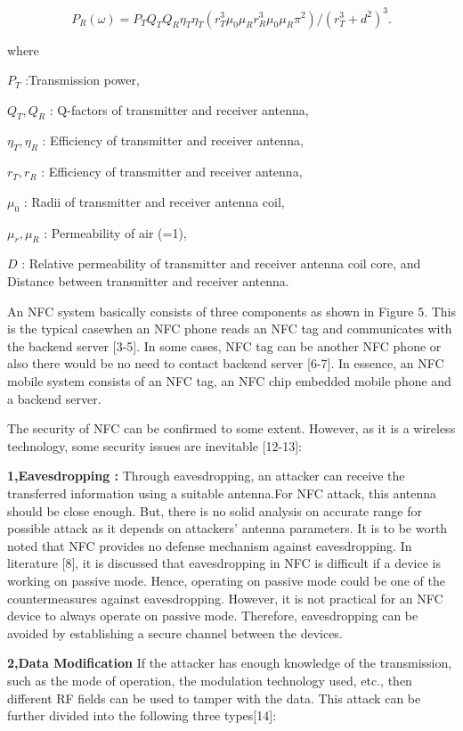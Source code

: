 \documentclass[journal]{IEEEtran}
\begin{document}
$$ P_{R}(\omega)=P_{T}Q_{T}Q_{R}\eta_{T}\eta_{T}(r_{T}^{3}\mu_{0}\mu_{R}r_{R}^{3}\mu_{0}\mu_{R}\pi^{2})/(r_{T}^{3}+d^{2})^{3}.$$

where 

$P_{T}$    :Transmission power,
           
$Q_{T},Q_{R}$           : Q-factors of transmitter and receiver antenna,
          
$\eta_{T},\eta_{R}$    : Efficiency of transmitter and receiver antenna,              
                      
$r_{T},r_{R}$            : Efficiency of transmitter and receiver antenna,
           
$\mu_{0}$                          : Radii of transmitter and receiver antenna coil,
           
$\mu_{r},\mu_{R}$                        : Permeability of air (=1),
           
$D$           : Relative permeability of transmitter and receiver antenna coil core, and Distance between transmitter and receiver antenna.

An NFC system basically consists of three components as shown in Figure 5. This is the typical casewhen an NFC phone reads an NFC tag and communicates with the backend server [3-5]. In some cases, NFC tag can be another NFC phone or also there would be no need to contact backend server [6-7]. In essence, an NFC mobile system consists of an NFC tag, an NFC chip embedded mobile phone
and a backend server.

The security of NFC can be confirmed to some extent. However, as it is a wireless technology, some security issues are inevitable [12-13]:

\textbf{1,Eavesdropping :} Through eavesdropping, an attacker can receive the transferred information using a suitable antenna.For NFC attack, this antenna should be close enough. But, there is no solid analysis on accurate range
for possible attack as it depends on attackers' antenna parameters. It is to be worth noted that NFC provides no defense mechanism against eavesdropping. In literature [8], it is discussed that eavesdropping in NFC is difficult if a device is working on passive mode. Hence, operating on passive mode could be one of the countermeasures against eavesdropping. However, it is not practical for an NFC device to always operate on passive mode. Therefore, eavesdropping can be avoided by establishing a secure channel between the devices.

\textbf{2,Data Modification}
If the attacker has enough knowledge of the transmission, such as the mode of operation, the modulation technology used, etc., then different RF fields can be used to tamper with the data. This attack can be further divided into the following three types[14]:
\end{document}

